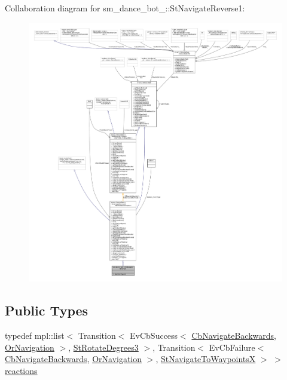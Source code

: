 Collaboration diagram for sm\+\_\+dance\+\_\+bot\+\_\+:\+:St\+Navigate\+Reverse1\+:
\nopagebreak
\begin{figure}[H]
\begin{center}
\leavevmode
\includegraphics[width=350pt]{structsm__dance__bot__2_1_1StNavigateReverse1__coll__graph}
\end{center}
\end{figure}
\subsection*{Public Types}
\begin{DoxyCompactItemize}
\item 
typedef mpl\+::list$<$ Transition$<$ Ev\+Cb\+Success$<$ \hyperlink{classcl__move__base__z_1_1CbNavigateBackwards}{Cb\+Navigate\+Backwards}, \hyperlink{classsm__dance__bot__2_1_1OrNavigation}{Or\+Navigation} $>$, \hyperlink{structsm__dance__bot__2_1_1StRotateDegrees3}{St\+Rotate\+Degrees3} $>$, Transition$<$ Ev\+Cb\+Failure$<$ \hyperlink{classcl__move__base__z_1_1CbNavigateBackwards}{Cb\+Navigate\+Backwards}, \hyperlink{classsm__dance__bot__2_1_1OrNavigation}{Or\+Navigation} $>$, \hyperlink{structsm__dance__bot__2_1_1StNavigateToWaypointsX}{St\+Navigate\+To\+WaypointsX} $>$ $>$ \hyperlink{structsm__dance__bot__2_1_1StNavigateReverse1_a29c709f81a04d776277fe903597ef43e}{reactions}
\end{DoxyCompactItemize}
